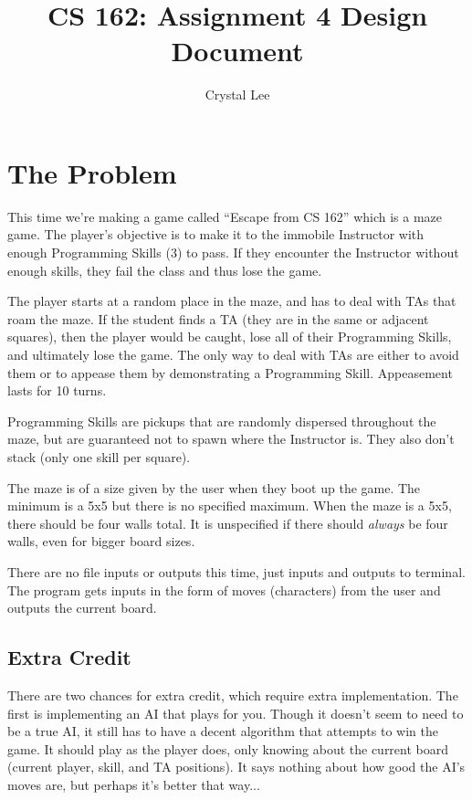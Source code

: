 \documentclass[11pt]{article} %
\title{CS 162: Assignment 4 Design Document}
\author{Crystal Lee}
\date{} %
\begin{document}
\maketitle

\section{The Problem}
This time we're making a game called ``Escape from CS 162'' which is a maze game. The player's objective is to make it to the immobile Instructor with enough Programming Skills (3) to pass. If they encounter the Instructor without enough skills, they fail the class and thus lose the game. 

The player starts at a random place in the maze, and has to deal with TAs that roam the maze. If the student finds a TA (they are in the same or adjacent squares), then the player would be caught, lose all of their Programming Skills, and ultimately lose the game. The only way to deal with TAs are either to avoid them or to appease them by demonstrating a Programming Skill. Appeasement lasts for 10 turns.

Programming Skills are pickups that are randomly dispersed throughout the maze, but are guaranteed not to spawn where the Instructor is. They also don't stack (only one skill per square). 

The maze is of a size given by the user when they boot up the game. The minimum is a 5x5 but there is no specified maximum. When the maze is a 5x5, there should be four walls total. It is unspecified if there should \textit{always} be four walls, even for bigger board sizes. 

There are no file inputs or outputs this time, just inputs and outputs to terminal. The program gets inputs in the form of moves (characters) from the user and outputs the current board.

\subsection{Extra Credit}
There are two chances for extra credit, which require extra implementation. The first is implementing an AI that plays for you. Though it doesn't seem to need to be a true AI, it still has to have a decent algorithm that attempts to win the game. It should play as the player does, only knowing about the current board (current player, skill, and TA positions). It says nothing about how good the AI's moves are, but perhaps it's better that way...
\end{document}

